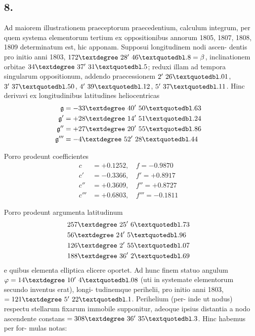 \documentclass[12pt,a4paper]{article}
\begin{document}
\subsection*{8.}

Ad maiorem illustrationem praeceptorum praecedentium, calculum integrum,
per quem systema elementorum tertium ex oppositionibus annorum 1805, 1807,
1808, 1809 determinatum est, hic apponam. Supposui longitudinem nodi ascen-
dentis pro initio anni 1803, $172\textdegree\ 28'\ 46\textquotedbl.8 = \beta$, inclinationem orbitae $34\textdegree\ 37'\ 31\textquotedbl.5$;
reduxi illam ad tempora singularum oppositionum, addendo praecessionem
$2'\ 26\textquotedbl.01$, $3'\ 37\textquotedbl.50$, $4'\ 39\textquotedbl.12$, $5'\ 37\textquotedbl.11$. Hinc derivavi ex longitudinibus
latitudines heliocentricas
\begin{align*}
\mathfrak{g} &= -33\textdegree\ 40'\ 50\textquotedbl.63 \\
\mathfrak{g}' &= +28\textdegree\ 14'\ 51\textquotedbl.24 \\
\mathfrak{g}'' &= +27\textdegree\ 20'\ 55\textquotedbl.86 \\
\mathfrak{g}''' &= -4\textdegree\ 52'\ 28\textquotedbl.44
\end{align*}

Porro prodeunt coefficientes
\begin{align*}
c &= +0.1252, \quad f = -0.9870 \\
c' &= -0.3366, \quad f' = +0.8917 \\
c'' &= +0.3609, \quad f'' = +0.8727 \\
c''' &= +0.6803, \quad f''' = -0.1811
\end{align*}

Porro prodeunt argumenta latitudinum
\begin{align*}
&257\textdegree\ 25'\ 6\textquotedbl.73 \\
&56\textdegree\ 24'\ 5\textquotedbl.96 \\
&126\textdegree\ 2'\ 55\textquotedbl.07 \\
&188\textdegree\ 36'\ 2\textquotedbl.69
\end{align*}
e quibus elementa elliptica elicere oportet. Ad hunc finem statuo angulum
$\varphi = 14\textdegree\ 10'\ 4\textquotedbl.08$ (uti in systemate elementorum secundo inventus erat), longi-
tudinemque perihelii, pro initio anni 1803, $= 121\textdegree\ 5'\ 22\textquotedbl.1$. Perihelium (per-
inde ut nodus) respectu stellarum fixarum immobile supponitur, adeoque ipsius
distantia a nodo ascendente constans $= 308\textdegree\ 36'\ 35\textquotedbl.3$. Hinc habemus per for-
mulas notas:
\end{document}
